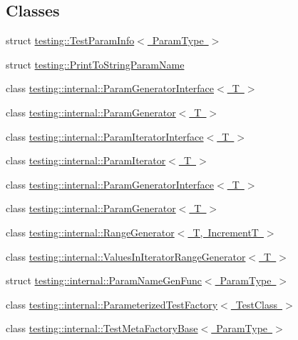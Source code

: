 \subsection*{Classes}
\begin{DoxyCompactItemize}
\item 
struct \mbox{\hyperlink{structtesting_1_1TestParamInfo}{testing\+::\+Test\+Param\+Info$<$ Param\+Type $>$}}
\item 
struct \mbox{\hyperlink{structtesting_1_1PrintToStringParamName}{testing\+::\+Print\+To\+String\+Param\+Name}}
\item 
class \mbox{\hyperlink{classtesting_1_1internal_1_1ParamGeneratorInterface}{testing\+::internal\+::\+Param\+Generator\+Interface$<$ T $>$}}
\item 
class \mbox{\hyperlink{classtesting_1_1internal_1_1ParamGenerator}{testing\+::internal\+::\+Param\+Generator$<$ T $>$}}
\item 
class \mbox{\hyperlink{classtesting_1_1internal_1_1ParamIteratorInterface}{testing\+::internal\+::\+Param\+Iterator\+Interface$<$ T $>$}}
\item 
class \mbox{\hyperlink{classtesting_1_1internal_1_1ParamIterator}{testing\+::internal\+::\+Param\+Iterator$<$ T $>$}}
\item 
class \mbox{\hyperlink{classtesting_1_1internal_1_1ParamGeneratorInterface}{testing\+::internal\+::\+Param\+Generator\+Interface$<$ T $>$}}
\item 
class \mbox{\hyperlink{classtesting_1_1internal_1_1ParamGenerator}{testing\+::internal\+::\+Param\+Generator$<$ T $>$}}
\item 
class \mbox{\hyperlink{classtesting_1_1internal_1_1RangeGenerator}{testing\+::internal\+::\+Range\+Generator$<$ T, Increment\+T $>$}}
\item 
class \mbox{\hyperlink{classtesting_1_1internal_1_1ValuesInIteratorRangeGenerator}{testing\+::internal\+::\+Values\+In\+Iterator\+Range\+Generator$<$ T $>$}}
\item 
struct \mbox{\hyperlink{structtesting_1_1internal_1_1ParamNameGenFunc}{testing\+::internal\+::\+Param\+Name\+Gen\+Func$<$ Param\+Type $>$}}
\item 
class \mbox{\hyperlink{classtesting_1_1internal_1_1ParameterizedTestFactory}{testing\+::internal\+::\+Parameterized\+Test\+Factory$<$ Test\+Class $>$}}
\item 
class \mbox{\hyperlink{classtesting_1_1internal_1_1TestMetaFactoryBase}{testing\+::internal\+::\+Test\+Meta\+Factory\+Base$<$ Param\+Type $>$}}
\item 

\end{DoxyCompactItemize}
